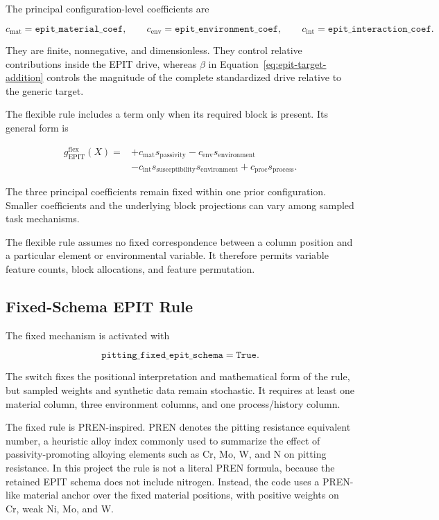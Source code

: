 \documentclass{article}
\begin{document}
The principal configuration-level coefficients are

\[
c_{\mathrm{mat}}
=
\texttt{epit\_material\_coef},
\qquad
c_{\mathrm{env}}
=
\texttt{epit\_environment\_coef},
\qquad
c_{\mathrm{int}}
=
\texttt{epit\_interaction\_coef}.
\]

They are finite, nonnegative, and dimensionless. They control relative contributions inside the EPIT drive, whereas \(\beta\) in Equation~\eqref{eq:epit-target-addition} controls the magnitude of the complete standardized drive relative to the generic target.

The flexible rule includes a term only when its required block is present. Its general form is

\begin{equation}
\begin{aligned}
g_{\mathrm{EPIT}}^{\mathrm{flex}}(X)
={}&
+c_{\mathrm{mat}}s_{\mathrm{passivity}}
-c_{\mathrm{env}}s_{\mathrm{environment}}\\
&-c_{\mathrm{int}}
s_{\mathrm{susceptibility}}
s_{\mathrm{environment}}
+c_{\mathrm{proc}}s_{\mathrm{process}}.
\end{aligned}
\label{eq:flexible-epit-drive}
\end{equation}

The three principal coefficients remain fixed within one prior configuration. Smaller coefficients and the underlying block projections can vary among sampled task mechanisms.

The flexible rule assumes no fixed correspondence between a column position and a particular element or environmental variable. It therefore permits variable feature counts, block allocations, and feature permutation.

\subsection{Fixed-Schema EPIT Rule}

The fixed mechanism is activated with

\[
\texttt{pitting\_fixed\_epit\_schema}
=
\texttt{True}.
\]

The switch fixes the positional interpretation and mathematical form of the rule, but sampled weights and synthetic data remain stochastic. It requires at least one material column, three environment columns, and one process/history column.

The fixed rule is PREN-inspired. PREN denotes the pitting resistance equivalent
number, a heuristic alloy index commonly used to summarize the effect of
passivity-promoting alloying elements such as Cr, Mo, W, and N on pitting
resistance. In this project the rule is not a literal PREN formula, because the
retained EPIT schema does not include nitrogen. Instead, the code uses a
PREN-like material anchor over the fixed material positions, with positive
weights on Cr, weak Ni, Mo, and W.
\end{document}
